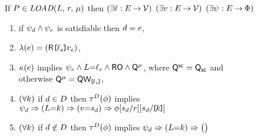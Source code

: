 \begin{figure*}
\begin{center}
\begin{minipage}{0.88\textwidth}

  \noindent
  If $\aPS \in \sLOAD[\amode]{\cExp}{\aReg}$ then
  $(\exists\cVal:\aEvs\fun\Val)$
  $(\exists\aVal:\aEvs\fun\Val)$
  $(\exists\bForm:\aEvs\fun\Formulae)$
  \begin{enumerate}
  \item if $\bForm_\bEv\land\bForm_\aEv$ is satisfiable then $\bEv=\aEv$,
  \item $\labelingAct(\aEv) = \DRREFP{\cVal_\aEv}{\aVal_\aEv}$,
  \item $\labelingForm(\aEv)$ implies
    \begin{math}
      \bForm_\aEv
      \land \cExp{=}\cVal_\aEv
      \land \RO
      \land \Qmode{\amode}
    \end{math},
    where    
    $\Qmode{\mSC}=\Q[\mSC]$ and otherwise $\Qmode{\amode}=\QwREF{\cVal_\aEv}$, %
  \item
    \begin{math}
      (\forall\dVal)
    \end{math}
    if $\bEv\in\bEvs$ then
    $\aTr[\bEvs](\aForm)$ implies
    \begin{math}
      \bForm_\bEv
      \limplies (\cExp{=}\dVal)
      \limplies (\aVal{=}\bReg_\bEv)
      \limplies \aForm[\bReg_\bEv/\aReg][\bReg_\bEv/\REF{\dVal}]
    \end{math}
    \makebox[4.4cm]{}
  \item 
    \begin{math}
      (\forall\dVal)
    \end{math}
    if $\bEv\notin\bEvs$ then
    $\aTr[\bEvs](\aForm)$ implies
    \begin{math}
      \bForm_\bEv
      \limplies (\cExp{=}\dVal)
      \limplies \PBRbig{        
}
\end{math}
\end{enumerate}
\end{minipage}
\end{center}
\end{figure*}
